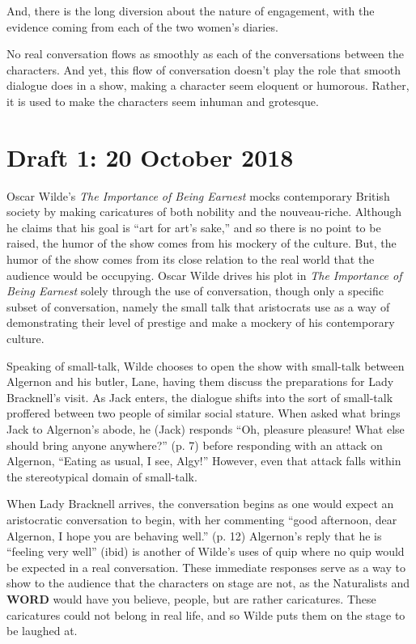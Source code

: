 \documentclass[12pt]{article}[titlepage]
\newcommand{\say}[1]{``#1''}
\newcommand{\1}{\={a}}
\newcommand{\2}{\={e}}
\newcommand{\3}{\={\i}}
\newcommand{\4}{\=o}
\newcommand{\5}{\=u}
\newcommand{\6}{\={A}}
\renewcommand{\,}{\textsuperscript{,}}
\begin{document}
And, there is the long diversion about the nature of engagement, with the evidence coming from each of the two women's diaries.
 
No real conversation flows as smoothly as each of the conversations between the characters.
And yet, this flow of conversation doesn't play the role that smooth dialogue does in a show, making a character seem eloquent or humorous.
Rather, it is used to make the characters seem inhuman and grotesque.

\section{Draft 1: 20 October 2018}
Oscar Wilde's \textit{The Importance of Being Earnest} mocks contemporary British society by making caricatures of both nobility and the nouveau-riche.
Although he claims that his goal is \say{art for art's sake,} and so there is no point to be raised, the humor of the show comes from his mockery of the culture.
But, the humor of the show comes from its close relation to the real world that the audience would be occupying.
Oscar Wilde drives his plot in \textit{The Importance of Being Earnest} solely through the use of conversation, though only a specific subset of conversation, namely the small talk that aristocrats use as a way of demonstrating their level of prestige and make a mockery of his contemporary culture.

Speaking of small-talk, Wilde chooses to open the show with small-talk between Algernon and his butler, Lane, having them discuss the preparations for Lady Bracknell's visit.
As Jack enters, the dialogue shifts into the sort of small-talk proffered between two people of similar social stature.
When asked what brings Jack to Algernon's abode, he (Jack) responds \say{Oh, pleasure pleasure! What else should bring anyone anywhere?} (p. 7) before responding with an attack on Algernon, \say{Eating as usual, I see, Algy!}
However, even that attack falls within the stereotypical domain of small-talk.

When Lady Bracknell arrives, the conversation begins as one would expect an aristocratic conversation to begin, with her commenting \say{good afternoon, dear Algernon, I hope you are behaving well.} (p. 12)
Algernon's reply that he is \say{feeling very well} (ibid) is another of Wilde's uses of quip where no quip would be expected in a real conversation.
These immediate responses serve as a way to show to the audience that the characters on stage are not, as the Naturalists and \textbf{WORD} would have you believe, people, but are rather caricatures.
These caricatures could not belong in real life, and so Wilde puts them on the stage to be laughed at.
\end{document}
